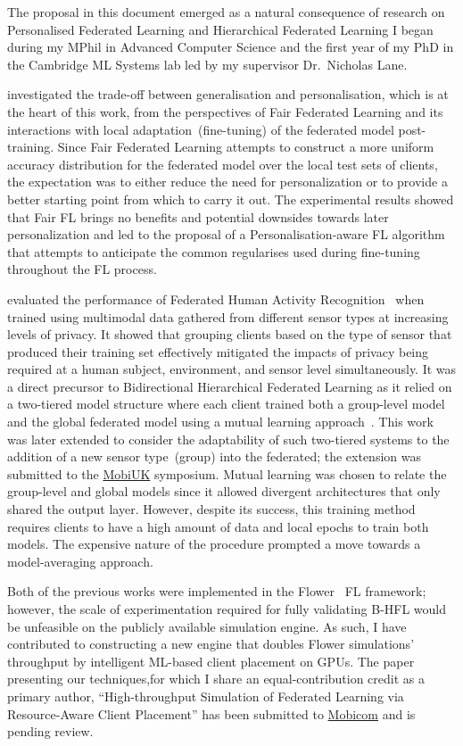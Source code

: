 The proposal in this document emerged as a natural consequence of research on Personalised Federated Learning and Hierarchical Federated Learning I began during my MPhil in Advanced Computer Science and the first year of my PhD in the Cambridge ML Systems lab led by my supervisor Dr.\ Nicholas Lane.

\citet{EuroMLSysWorkshop} investigated the trade-off between generalisation and personalisation, which is at the heart of this work, from the perspectives of Fair Federated Learning and its interactions with local adaptation~(fine-tuning) of the federated model post-training. Since Fair Federated Learning attempts to construct a more uniform accuracy distribution for the federated model over the local test sets of clients, the expectation was to either reduce the need for personalization or to provide a better starting point from which to carry it out. The experimental results showed that Fair FL brings no benefits and potential downsides towards later personalization and led to the proposal of a Personalisation-aware FL algorithm that attempts to anticipate the common regularises used during fine-tuning throughout the FL process.

\citet{OperaWorkshop} evaluated the performance of Federated Human Activity Recognition~\citep{HARusingFL_2018} when trained using multimodal data gathered from different sensor types at increasing levels of privacy. It showed that grouping clients based on the type of sensor that produced their training set effectively mitigated the impacts of privacy being required at a human subject, environment, and sensor level simultaneously. It was a direct precursor to Bidirectional Hierarchical Federated Learning as it relied on a two-tiered model structure where each client trained both a group-level model and the global federated model using a mutual learning approach~\citep{DeepMutualLearning}. This work was later extended to consider the adaptability of such two-tiered systems to the addition of a new sensor type~(group) into the federated; the extension was submitted to the \href{https://mobiuk.org/2023}{MobiUK} symposium. Mutual learning was chosen to relate the group-level and global models since it allowed divergent architectures that only shared the output layer. However, despite its success, this training method requires clients to have a high amount of data and local epochs to train both models. The expensive nature of the procedure prompted a move towards a model-averaging approach.

Both of the previous works were implemented in the Flower~\citep{Flower} FL framework; however, the scale of experimentation required for fully validating B-HFL would be unfeasible on the publicly available simulation engine. As such, I have contributed to constructing a new engine that doubles Flower simulations' throughput by intelligent ML-based client placement on GPUs. The paper presenting our techniques,for which I share an equal-contribution credit as a primary author, ``High-throughput Simulation of Federated Learning via Resource-Aware Client Placement'' has been submitted to \href{https://sigmobile.org/mobicom/2023/}{Mobicom} and is pending review.


